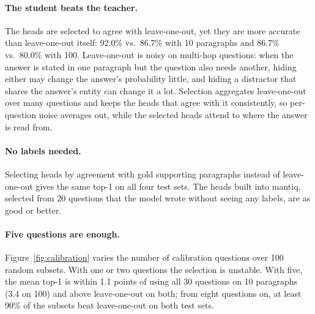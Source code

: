 \documentclass[11pt]{article}
\begin{document}
\paragraph{The student beats the teacher.} The heads are selected to agree with leave-one-out, yet they are more accurate than leave-one-out itself: 92.0\% vs.\ 86.7\% with 10 paragraphs and 86.7\% vs.\ 80.0\% with 100. Leave-one-out is noisy on multi-hop questions: when the answer is stated in one paragraph but the question also needs another, hiding either may change the answer's probability little, and hiding a distractor that shares the answer's entity can change it a lot. Selection aggregates leave-one-out over many questions and keeps the heads that agree with it consistently, so per-question noise averages out, while the selected heads attend to where the answer is read from.

\paragraph{No labels needed.} Selecting heads by agreement with gold supporting paragraphs instead of leave-one-out gives the same top-1 on all four test sets. The heads built into mantiq, selected from 20 questions that the model wrote without seeing any labels, are as good or better.

\paragraph{Five questions are enough.} Figure~\ref{fig:calibration} varies the number of calibration questions over 100 random subsets. With one or two questions the selection is unstable. With five, the mean top-1 is within 1.1 points of using all 30 questions on 10 paragraphs (3.4 on 100) and above leave-one-out on both; from eight questions on, at least 90\% of the subsets beat leave-one-out on both test sets.
\end{document}
